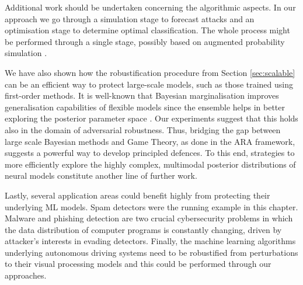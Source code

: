 

Additional work should be undertaken concerning the
algorithmic aspects.  In our approach  we go through a simulation stage to forecast attacks and an optimisation stage to determine optimal classification. The whole process might be performed through a single stage, possibly based on augmented probability simulation \parencite{ekin2019augmented}.

We have also shown how the robustification procedure from Section \ref{sec:scalable} can be an efficient way to protect large-scale models, such as those trained using first-order methods. It is well-known that Bayesian marginalisation improves generalisation capabilities of flexible models since the ensemble helps in better exploring the posterior parameter space \parencite{wilson2020bayesian}. Our experiments suggest 
that this holds also in the domain of adversarial robustness. Thus, bridging the gap between large scale Bayesian methods and Game Theory, as  done in the ARA framework, suggests a powerful way to develop principled defences. To this end, strategies to more efficiently explore the highly complex, multimodal posterior distributions of neural models constitute another line of further work.

Lastly, several application areas could benefit highly from
protecting their underlying ML models. Spam detectors were
the running example in this chapter. Malware and phishing detection are two
crucial cybersecurity problems in which the data distribution of computer programs is constantly changing, driven by attacker's interests in evading detectors. Finally, the machine learning algorithms underlying 
autonomous driving systems need to be robustified from perturbations to their visual processing models and this could be performed through our 
approaches.



